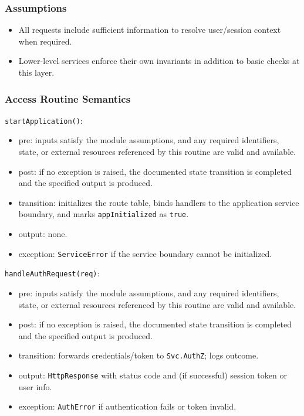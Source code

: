 \documentclass[12pt, titlepage]{article}
\begin{document}
\subsubsection{Assumptions}
\begin{itemize}
    \item All requests include sufficient information to resolve user/session context when required.
    \item Lower-level services enforce their own invariants in addition to basic checks at this layer.
\end{itemize}

\subsubsection{Access Routine Semantics}

\noindent \texttt{startApplication()}:
\begin{itemize}
    \item pre: inputs satisfy the module assumptions, and any required identifiers, state, or external resources referenced by this routine are valid and available.
    \item post: if no exception is raised, the documented state transition is completed and the specified output is produced.
    \item transition: initializes the route table, binds handlers to the application service boundary, and marks \texttt{appInitialized} as \texttt{true}.
    \item output: none.
    \item exception: \texttt{ServiceError} if the service boundary cannot be initialized.
\end{itemize}

\noindent \texttt{handleAuthRequest(req)}:
\begin{itemize}
    \item pre: inputs satisfy the module assumptions, and any required identifiers, state, or external resources referenced by this routine are valid and available.
    \item post: if no exception is raised, the documented state transition is completed and the specified output is produced.
    \item transition: forwards credentials/token to \texttt{Svc.AuthZ}; logs outcome.
    \item output: \texttt{HttpResponse} with status code and (if successful) session token or user info.
    \item exception: \texttt{AuthError} if authentication fails or token invalid.
\end{itemize}
\end{document}
